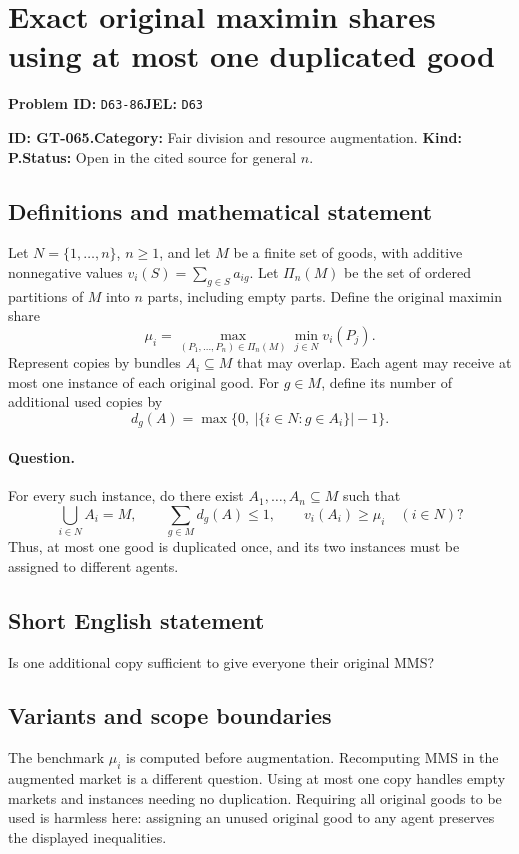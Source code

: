 \documentclass[11pt,a4paper]{article}
\begin{document}
\section*{Exact original maximin shares using at most one duplicated good}
\textbf{Problem ID:} \texttt{D63-86}\quad \textbf{JEL:} \texttt{D63}\par
\label{problem:OP-0195}
\label{game:GT-065}
{\sffamily\small\color{muted}
\noindent\textbf{ID: GT-065.}\quad\textbf{Category:} Fair division and resource augmentation.
\quad\textbf{Kind: P.}\quad\textbf{Status:} Open in the cited source for general \(n\).
\par}
\subsection*{Definitions and mathematical statement}
Let \(N=\{1,\ldots,n\}\), \(n\geq 1\), and let \(M\) be a finite set
of goods, with additive nonnegative values \(v_i(S)=\sum_{g\in S}a_{ig}\).
Let \(\Pi_n(M)\) be the set of ordered partitions of \(M\) into \(n\)
parts, including empty parts. Define the original maximin share
\[
 \mu_i=\max_{(P_1,\ldots,P_n)\in\Pi_n(M)}
              \min_{j\in N}v_i(P_j).
\]
Represent copies by bundles \(A_i\subseteq M\) that may overlap.
Each agent may receive at most one instance of each original good.
For \(g\in M\), define its number of additional used copies by
\[
 d_g(A)=\max\bigl\{0,\ |\{i\in N:g\in A_i\}|-1\bigr\}.
\]

\paragraph{Question.}
For every such instance, do there exist \(A_1,\ldots,A_n\subseteq M\)
such that
\[
 \bigcup_{i\in N}A_i=M,\qquad
 \sum_{g\in M}d_g(A)\leq 1,\qquad
 v_i(A_i)\geq\mu_i\quad(i\in N)?
\]
Thus, at most one good is duplicated once, and its two instances must be
assigned to different agents.

\subsection*{Short English statement}
Is one additional copy sufficient to give everyone their original MMS?

\subsection*{Variants and scope boundaries}
The benchmark \(\mu_i\) is computed before augmentation. Recomputing MMS
in the augmented market is a different question. Using at most one copy
handles empty markets and instances needing no duplication. Requiring all
original goods to be used is harmless here: assigning an unused original
good to any agent preserves the displayed inequalities.
\end{document}
